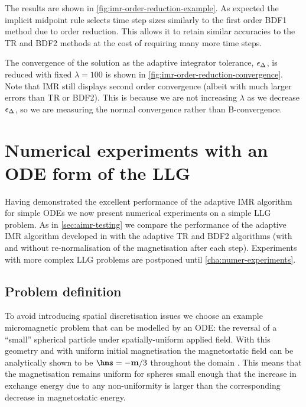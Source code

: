 The results are shown in \cref{fig:imr-order-reduction-example}.
As expected the implicit midpoint rule selects time step sizes similarly to the first order BDF1 method due to order reduction.
This allows it to retain similar accuracies to the TR and BDF2 methods at the cost of requiring many more time steps.

The convergence of the solution as the adaptive integrator tolerance, $\epsilon_{\Delta_{}}$, is reduced with fixed $\lambda = 100$ is shown in \cref{fig:imr-order-reduction-convergence}.
Note that IMR still displays second order convergence (albeit with much larger errors than TR or BDF2).
This is because we are not increasing $\lambda$ as we decrease $\epsilon_{\Delta_{}}$, so we are measuring the normal convergence rather than B-convergence.

\FloatBarrier %

\section{Numerical experiments with an ODE form of the LLG}
\label{sec:imr-ode-llg-numer-exper}


Having demonstrated the excellent performance of the adaptive IMR algorithm for simple ODEs we now present numerical experiments on a simple LLG problem.
As in \cref{sec:aimr-testing} we compare the performance of the adaptive IMR algorithm developed in  with the adaptive TR and BDF2 algorithms (with and without re-normalisation of the magnetisation after each step).
Experiments with more complex LLG problems are postponed until \cref{cha:numer-experiments}.

\subsection{Problem definition}
\label{sec:aimr-llg-problem-definition}

To avoid introducing spatial discretisation issues we choose an example micromagnetic problem that can be modelled by an ODE: the reversal of a ``small'' spherical particle under spatially-uniform applied field.
With this geometry and with uniform initial magnetisation the magnetostatic field can be analytically shown to be $\hms = -\mv/3$ throughout the domain \cite[112]{Aharoni1996}.
This means that the magnetisation remains uniform for spheres small enough that the increase in exchange energy due to any non-uniformity is larger than the corresponding decrease in magnetostatic energy.

